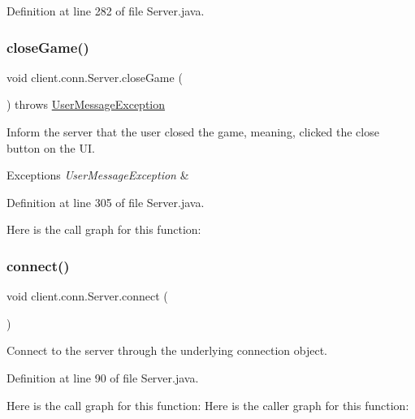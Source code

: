 Definition at line 282 of file Server.\+java.

\hypertarget{classclient_1_1conn_1_1_server_a5d1f1961306d3e06c895abc90dfddf9f}{}\label{classclient_1_1conn_1_1_server_a5d1f1961306d3e06c895abc90dfddf9f} 
\subsubsection{\texorpdfstring{close\+Game()}{closeGame()}}
{\footnotesize\ttfamily void client.\+conn.\+Server.\+close\+Game (\begin{DoxyParamCaption}{ }\end{DoxyParamCaption}) throws \hyperlink{classpt_1_1up_1_1fe_1_1lpro1613_1_1sharedlib_1_1exceptions_1_1_user_message_exception}{User\+Message\+Exception}}

Inform the server that the user closed the game, meaning, clicked the close button on the UI. 
\begin{DoxyExceptions}{Exceptions}
{\em User\+Message\+Exception} & \\
\hline
\end{DoxyExceptions}


Definition at line 305 of file Server.\+java.

Here is the call graph for this function\+:
\hypertarget{classclient_1_1conn_1_1_server_a7e96a6bd486520d128a37a8216cf37c3}{}\label{classclient_1_1conn_1_1_server_a7e96a6bd486520d128a37a8216cf37c3} 
\subsubsection{\texorpdfstring{connect()}{connect()}}
{\footnotesize\ttfamily void client.\+conn.\+Server.\+connect (\begin{DoxyParamCaption}{ }\end{DoxyParamCaption})}

Connect to the server through the underlying connection object. 

Definition at line 90 of file Server.\+java.

Here is the call graph for this function\+:
Here is the caller graph for this function\+:
\hypertarget{classclient_1_1conn_1_1_server_ac8ad09c9052bfb32e082493ada8d14ab}{}\label{classclient_1_1conn_1_1_server_ac8ad09c9052bfb32e082493ada8d14ab} 
